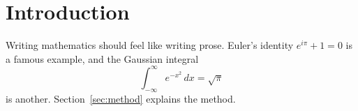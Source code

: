 \section{Introduction}\label{sec:introduction}
Writing mathematics should feel like writing prose. Euler's identity
$e^{i\pi} + 1 = 0$ is a famous example, and the Gaussian integral
\[
  \int_{-\infty}^{\infty} e^{-x^2}\,dx = \sqrt{\pi}
\]
is another. Section~\ref{sec:method} explains the method.
